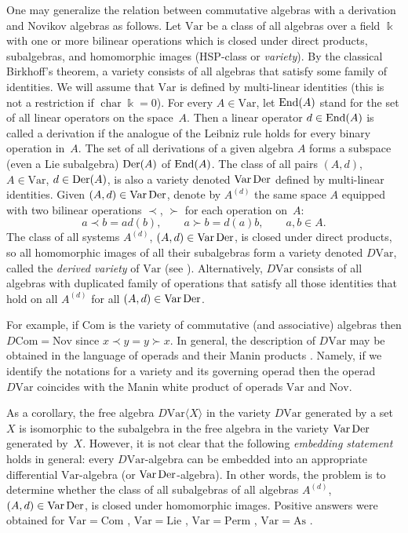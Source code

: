 \documentclass[11pt]{article}
\numberwithin{equation}{section}
\numberwithin{equation}{section}
\def\Var{\mathrm{Var}}
\def\Nov{\mathrm{Nov}}
\def\Com{\mathrm{Com}}
\def\As{\mathrm{As}}
\def\Lie{\mathrm{Lie}}
\def\Perm{\mathrm{Perm}}
\def\Der {\mathop {\fam 0 Der}\nolimits}
\def\End {\mathop {\fam 0 End}\nolimits}
\begin{document}
One may generalize the relation between commutative algebras with a derivation and Novikov algebras as follows.
Let $\Var$ be a class of all algebras over a field $\Bbbk $ with one or more bilinear operations which is closed under direct products, subalgebras, and homomorphic images (HSP-class or {\em variety}).
By the classical Birkhoff's theorem, a variety consists of all algebras
that satisfy some family of identities.
We will assume that $\Var $ is defined by multi-linear identities (this is not a restriction if $\operatorname{char}\Bbbk =0$).
For every $A\in \Var $, let $\End(A)$ stand for the set
of all linear operators on the space~$A$.
Then a linear operator $d\in \End(A)$
is called a derivation if the analogue of the Leibniz rule
holds for every binary operation in~$A$.
The set of all derivations of a given algebra $A$ forms a subspace (even a Lie subalgebra) $\Der(A)$ of $\End(A)$.
The class of all pairs $(A,d)$, $A\in \Var$, $d\in \Der(A)$,
is also a variety denoted $\Var\Der$ defined by multi-linear identities.
Given $(A,d)\in \Var\Der$, denote by
$A^{(d)}$ the same space $A$ equipped with two bilinear operations
$\prec$, $\succ $ for each operation on~$A$:
\[
a\prec b = ad(b),\qquad a\succ b = d(a)b, \qquad a,b\in A.
\]
The class of all systems $A^{(d)}$, $(A,d)\in \Var\Der$,
is closed under direct products, so all homomorphic images of
all their subalgebras form a variety denoted $D\Var$,
called the {\em derived variety} of $\Var $ (see \cite{KSO2019}).
Alternatively, $D\Var $ consists of all algebras with duplicated family
of operations that satisfy all those identities that hold on all $A^{(d)}$
for all $(A,d)\in \Var\Der$.

For example, if $\Com $ is the variety of commutative (and associative) algebras then $D\Com = \Nov$ since
$x\prec y = y\succ x$. In general, the description of
$D\Var $ may be obtained in the language of operads and their
Manin products \cite{KSO2019}. Namely, if we identify the notations
for a variety and its governing operad \cite{GK-1994}
then the operad
$D\Var $ coincides with the Manin white product of operads
$\Var $ and $\Nov $.

As a corollary, the free algebra $D\Var \langle X\rangle $
in the variety $D\Var $ generated by a set $X$
is isomorphic to
the subalgebra in the free algebra in the variety
$\Var\Der$ generated by~$X$. However, it is not clear that
the following {\em embedding statement} holds in general:
 every
$D\Var$-algebra can be embedded into an appropriate
differential $\Var$-algebra (or $\Var\Der$-algebra).
In other words, the problem is to determine whether the
class of all subalgebras of all algebras $A^{(d)}$,
$(A,d)\in \Var\Der$,
is closed under homomorphic images.
Positive answers were obtained
for $\Var =\Com $ \cite{BCZ-2017}, $\Var=\Lie$ \cite{KSO2019}, $\Var=\Perm$ \cite{KS2022}, $\Var=\As$ \cite{SK-2022}.
\end{document}
